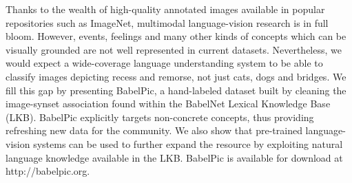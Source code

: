 Thanks to the wealth of high-quality annotated images available in popular repositories such as ImageNet, multimodal language-vision research is in full bloom. However, events, feelings and many other kinds of concepts which can be visually grounded are not well represented in current datasets. Nevertheless, we would expect a wide-coverage language understanding system to be able to classify images depicting recess and remorse, not just cats, dogs and bridges. We fill this gap by presenting BabelPic, a hand-labeled dataset built by cleaning the image-synset association found within the BabelNet Lexical Knowledge Base (LKB). BabelPic explicitly targets non-concrete concepts, thus providing refreshing new data for the community. We also show that pre-trained language-vision systems can be used to further expand the resource by exploiting natural language knowledge available in the LKB. BabelPic is available for download at http://babelpic.org.
